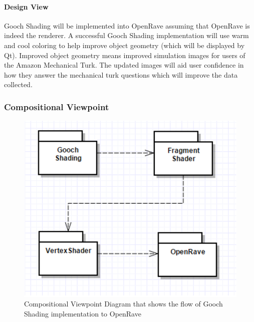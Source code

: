 \begin{flushleft}
\paragraph{Design View}
Gooch Shading will be implemented into OpenRave assuming that OpenRave is indeed the renderer.
A successful Gooch Shading implementation will use warm and cool coloring to help improve object geometry (which will be displayed by Qt).
Improved object geometry means improved simulation images for users of the Amazon Mechanical Turk.
The updated images will aid user confidence in how they answer the mechanical turk questions which will improve the data collected.

\subsubsection{Compositional Viewpoint}

\begin{figure} [H]
  \includegraphics[scale=0.9]{designdoc_v1/Gooch_Shading2_composition.eps}
  \caption
{ \newline \hspace{\linewidth}
Compositional Viewpoint Diagram that shows the flow of Gooch Shading implementation to OpenRave}
  \label{fig:Gooch_Shading2_composition}
\end{figure}


\end{flushleft}
